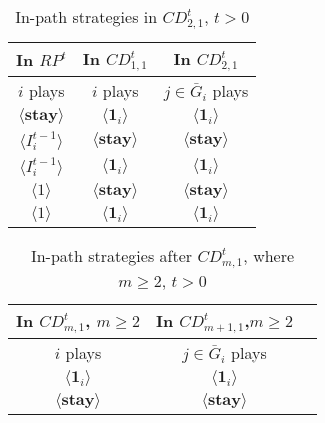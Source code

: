 \documentclass[12pt,letter]{article}
\theoremstyle{definition}
\theoremstyle{remark}
\theoremstyle{claim}
\begin{document}
\begin{table}[t]
\caption{In-path strategies in $CD^t_{2,1}$, $t>0$}
\label{Table_stg_cdt21}
\begin{center}
\begin{tabular}{c c c}
In $RP^t$ 	 	&  	In $CD^t_{1,1}$		&  In $CD^t_{2,1}$	\\
\hline
\hline
$i$ plays 		  							&  	$i$ plays									& $j\in \bar{G}_{i}$ plays  \\
\hline
$\langle  \textbf{stay} \rangle$ 	& 	$\langle \mathbf{1}_i \rangle$	    & $\langle \mathbf{1}_i \rangle$ \\
$\langle  {I^{t-1}_i} \rangle$ 		&  $\langle \textbf{stay} \rangle$		& $\langle \textbf{stay} \rangle$     \\
$\langle  {I^{t-1}_i} \rangle$ 		&  $\langle \mathbf{1}_i \rangle$		& $\langle \mathbf{1}_i \rangle$     \\
$\langle 1 \rangle$ 		             &  $\langle \textbf{stay} \rangle$		& $\langle \textbf{stay} \rangle$  \\
$\langle 1 \rangle$ 		             &  $\langle \mathbf{1}_i \rangle$		&  $\langle \mathbf{1}_i \rangle$  
\end{tabular}
\end{center}
\end{table}

\begin{table}[t]
\caption{In-path strategies after $CD^t_{m,1}$, where $m\geq 2$, $t>0$}
\label{Table_stg_cdtm1}
\begin{center}
\begin{tabular}{c c c}
In $CD^t_{m,1}$, $m\geq 2$ 	 	&  	In $CD^t_{m+1,1}$,$m\geq 2$		& 	\\
\hline
\hline
$i$ plays 		  							&  $j\in \bar{G}_{i}$ plays  								& \\
\hline
$\langle \mathbf{1}_i \rangle$ 	& 	$\langle \mathbf{1}_i \rangle$	    &  \\
$\langle \textbf{stay} \rangle$		&  $\langle \textbf{stay} \rangle$	&  \\

\end{tabular}
\end{center}
\end{table}
\end{document}
